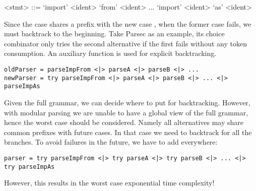 \setlength{\grammarindent}{5em}
\begin{grammar}
<stmt> ::= `import' <ident> `from' <ident>
    \alt ...
    \alt `import' <ident> `as' <ident>
\end{grammar}

Since the  case shares a prefix with the new case , when the former case fails, we must backtrack to the beginning. Take Parsec as an example, its choice
combinator \inlinecode{<|>} only tries the second alternative if the first fails
without any token consumption. An auxiliary function  is used for explicit backtracking.

\begin{lstlisting}[language=PlainCode]
oldParser = parseImpFrom <|> parseA <|> parseB <|> ...
newParser = try parseImpFrom <|> parseA <|> parseB <|> ... <|> parseImpAs
\end{lstlisting}

Given the full grammar, we can decide where to put  for backtracking. However, with modular parsing we are unable to have a global view of the full grammar, hence the worst case should be considered. Namely all alternatives may share common prefixes with future cases. In that case we need to backtrack for all the branches. To avoid failures in the future, we have to add  everywhere:

\begin{lstlisting}[language=PlainCode]
parser = try parseImpFrom <|> try parseA <|> try parseB <|> ... <|> try parseImpAs
\end{lstlisting}

\noindent However, this results in the worst case exponential time complexity!

